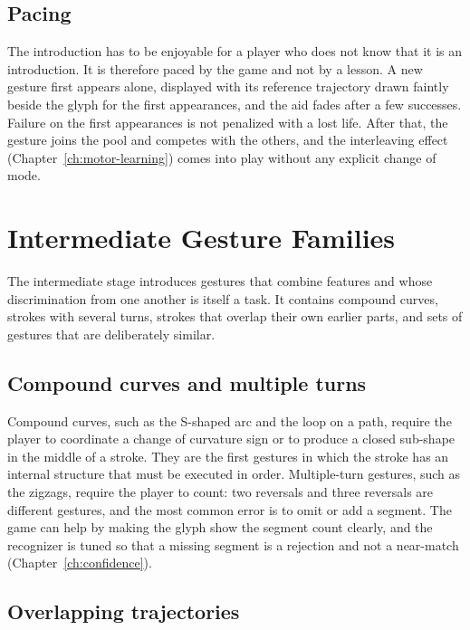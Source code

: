 \section{Pacing}

The introduction has to be enjoyable for a player who does not know that it is an introduction. It is therefore paced by the game and not by a lesson. A new gesture first appears alone, displayed with its reference trajectory drawn faintly beside the glyph for the first appearances, and the aid fades after a few successes. Failure on the first appearances is not penalized with a lost life. After that, the gesture joins the pool and competes with the others, and the interleaving effect (Chapter~\ref{ch:motor-learning}) comes into play without any explicit change of mode.\evS

\chapter{Intermediate Gesture Families}\label{ch:intermediate}

The intermediate stage introduces gestures that combine features and whose discrimination from one another is itself a task. It contains compound curves, strokes with several turns, strokes that overlap their own earlier parts, and sets of gestures that are deliberately similar.

\section{Compound curves and multiple turns}

Compound curves, such as the S-shaped arc and the loop on a path, require the player to coordinate a change of curvature sign or to produce a closed sub-shape in the middle of a stroke. They are the first gestures in which the stroke has an internal structure that must be executed in order. Multiple-turn gestures, such as the zigzags, require the player to count: two reversals and three reversals are different gestures, and the most common error is to omit or add a segment. The game can help by making the glyph show the segment count clearly, and the recognizer is tuned so that a missing segment is a rejection and not a near-match (Chapter~\ref{ch:confidence}).

\section{Overlapping trajectories}

